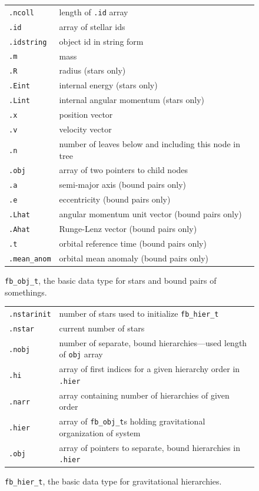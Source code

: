 \documentclass[10pt,preprint]{aastex} %
\begin{document}
\begin{figure}
  \begin{tabular}{ | l | p{10cm} |}
    \hline
    {\tt .ncoll}& length of {\tt .id} array\\
    {\tt .id}& array of stellar ids\\
    {\tt .idstring}& object id in string form\\
    {\tt .m}& mass\\
    {\tt .R}& radius (stars only)\\
    {\tt .Eint}& internal energy (stars only)\\
    {\tt .Lint}& internal angular momentum (stars only)\\
    {\tt .x}& position vector\\
    {\tt .v}& velocity vector\\
    {\tt .n}& number of leaves below and including this node in tree\\
    {\tt .obj}& array of two pointers to child nodes\\
    {\tt .a}& semi-major axis (bound pairs only)\\
    {\tt .e}& eccentricity (bound pairs only)\\
    {\tt .Lhat}& angular momentum unit vector (bound pairs only)\\
    {\tt .Ahat}& Runge-Lenz vector (bound pairs only)\\
    {\tt .t}& orbital reference time (bound pairs only)\\
    {\tt .mean\_anom}& orbital mean anomaly (bound pairs only)\\
    \hline
  \end{tabular}
  \caption{{\tt fb\_obj\_t}, the basic data type for stars and bound pairs of somethings.}
\end{figure}

\begin{figure}
  \begin{tabular}{ | l | p{10cm} |}
    \hline
    {\tt .nstarinit}& number of stars used to initialize {\tt fb\_hier\_t}\\
    {\tt .nstar}& current number of stars\\
    {\tt .nobj}& number of separate, bound hierarchies---used length of {\tt obj} array\\
    {\tt .hi}& array of first indices for a given hierarchy order in {\tt .hier}\\
    {\tt .narr}& array containing number of hierarchies of given order\\
    {\tt .hier}& array of {\tt fb\_obj\_t}s holding gravitational organization of system\\
    {\tt .obj}& array of pointers to separate, bound hierarchies in {\tt .hier}\\
    \hline
  \end{tabular}
  \caption{{\tt fb\_hier\_t}, the basic data type for gravitational hierarchies.}
\end{figure}

\acknowledgements



\end{document}
